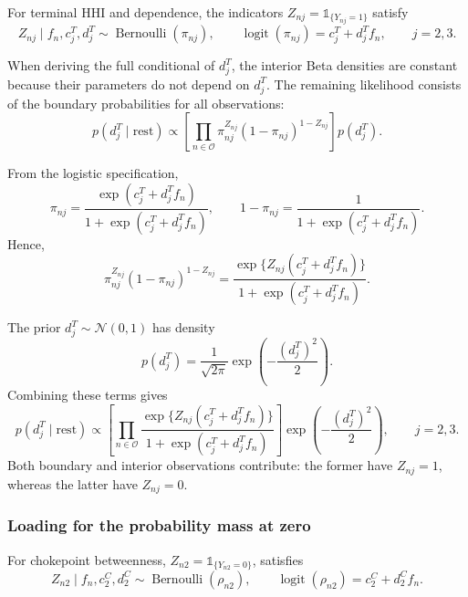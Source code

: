 \documentclass[pdftex,12pt,openright,a4paper,oneside]{book}
\begin{document}
For terminal HHI and dependence, the indicators
$Z_{nj}=\mathds{1}_{\{Y_{nj}=1\}}$ satisfy
\begin{equation*}
Z_{nj}\mid f_n,c_j^T,d_j^T
\sim\operatorname{Bernoulli}(\pi_{nj}),
\qquad
\operatorname{logit}(\pi_{nj})
=
c_j^T+d_j^Tf_n,
\qquad j=2,3.
\end{equation*}

When deriving the full conditional of $d_j^T$,
the interior Beta densities are constant because
their parameters do not depend on $d_j^T$.
The remaining likelihood consists of the boundary
probabilities for all observations:
\begin{equation*}
p(d_j^T\mid\mathrm{rest})
\propto
\left[
\prod_{n\in\mathcal{O}}
\pi_{nj}^{Z_{nj}}
(1-\pi_{nj})^{1-Z_{nj}}
\right]
p(d_j^T).
\end{equation*}

From the logistic specification,
\begin{equation*}
\pi_{nj}
=
\frac{\exp(c_j^T+d_j^Tf_n)}
{1+\exp(c_j^T+d_j^Tf_n)},
\qquad
1-\pi_{nj}
=
\frac{1}{1+\exp(c_j^T+d_j^Tf_n)}.
\end{equation*}
Hence,
\begin{equation*}
\pi_{nj}^{Z_{nj}}
(1-\pi_{nj})^{1-Z_{nj}}
=
\frac{
\exp\{Z_{nj}(c_j^T+d_j^Tf_n)\}
}{
1+\exp(c_j^T+d_j^Tf_n)
}.
\end{equation*}

The prior $d_j^T\sim\mathcal{N}(0,1)$ has density
\begin{equation*}
p(d_j^T)
=
\frac{1}{\sqrt{2\pi}}
\exp\!\left(-\frac{(d_j^T)^2}{2}\right).
\end{equation*}
Combining these terms gives
\begin{equation*}
p(d_j^T\mid\mathrm{rest})
\propto 
\left[
\prod_{n\in\mathcal{O}}
\frac{
\exp\{Z_{nj}(c_j^T+d_j^Tf_n)\}
}{
1+\exp(c_j^T+d_j^Tf_n)
}
\right]
\exp\!\left(-\frac{(d_j^T)^2}{2}\right),
\qquad j=2,3.
\end{equation*}
Both boundary and interior observations contribute:
the former have $Z_{nj}=1$, whereas the latter
have $Z_{nj}=0$.

\subsubsection{Loading for the probability mass at zero}

For chokepoint betweenness,
$Z_{n2}=\mathds{1}_{\{Y_{n2}=0\}}$,  satisfies
\begin{equation*}
Z_{n2}\mid f_n,c_2^C,d_2^C
\sim\operatorname{Bernoulli}(\rho_{n2}),
\qquad
\operatorname{logit}(\rho_{n2})
=
c_2^C+d_2^Cf_n.
\end{equation*}
\end{document}
